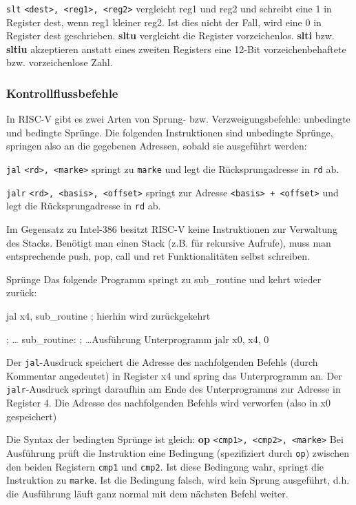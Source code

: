 \texttt{slt} \texttt{<dest>, <reg1>, <reg2>} vergleicht reg1 und reg2 und
schreibt eine 1 in Register dest, wenn reg1 kleiner reg2. Ist dies nicht der
Fall, wird eine 0 in Register dest geschrieben. \textbf{sltu} vergleicht die
Register vorzeichenlos. \textbf{slti} bzw. \textbf{sltiu} akzeptieren anstatt
eines zweiten Registers eine 12-Bit vorzeichenbehaftete bzw. vorzeichenlose
Zahl.

\subsubsection{Kontrollflussbefehle} \label{manual-riscv-jump-instructions} In
RISC-V gibt es zwei Arten von Sprung- bzw. Verzweigungsbefehle: unbedingte und
bedingte Sprünge. Die folgenden Instruktionen sind unbedingte Sprünge, springen
also an die gegebenen Adressen, sobald sie ausgeführt werden:

\texttt{jal} \texttt{<rd>, <marke>} springt zu \texttt{marke} und legt die
Rücksprungadresse in \texttt{rd} ab.

\texttt{jalr} \texttt{<rd>, <basis>, <offset>} springt zur Adresse
\texttt{<basis> + <offset>} und legt die Rücksprungadresse in \texttt{rd} ab.

Im Gegensatz zu Intel-386 besitzt RISC-V keine Instruktionen zur Verwaltung des
Stacks. Benötigt man einen Stack (z.B. für rekursive Aufrufe), muss man
entsprechende push, pop, call und ret Funktionalitäten selbst schreiben.

\begin{exampleblock}{Sprünge}
Das folgende Programm springt zu sub\_routine und kehrt wieder zurück:
\begin{riscv}
  jal x4, sub_routine
  ; hierhin wird zurückgekehrt

  ; \dots
sub_routine:
  ; \dots Ausführung Unterprogramm
  jalr x0, x4, 0
\end{riscv}

Der \texttt{jal}-Ausdruck speichert die Adresse des nachfolgenden Befehls (durch
Kommentar angedeutet) in Register x4 und spring das Unterprogramm an. Der
\texttt{jalr}-Ausdruck springt daraufhin am Ende des Unterprogramms zur Adresse
in Register 4. Die Adresse des nachfolgenden Befehls wird verworfen (also in x0
gespeichert)
\end{exampleblock}

Die Syntax der bedingten Sprünge ist gleich: \textbf{op} \texttt{<cmp1>, <cmp2>,
<marke>} Bei Ausführung prüft die Instruktion eine Bedingung (spezifiziert durch
\texttt{op}) zwischen den beiden Registern \texttt{cmp1} und \texttt{cmp2}. Ist
diese Bedingung wahr, springt die Instruktion zu \texttt{marke}. Ist die
Bedingung falsch, wird kein Sprung ausgeführt, d.h. die Ausführung läuft ganz
normal mit dem nächsten Befehl weiter.

